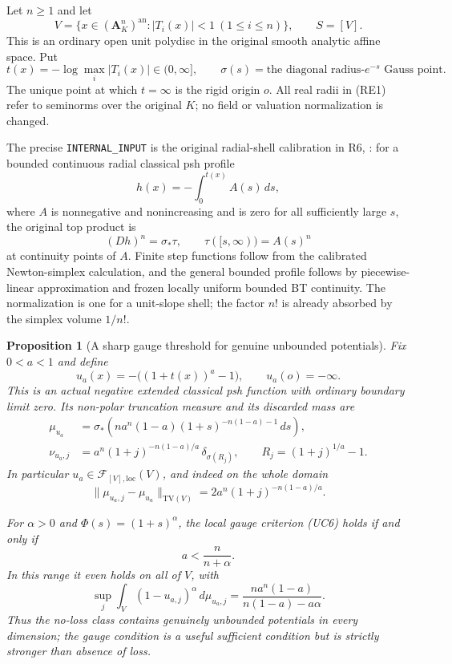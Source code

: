 \documentclass[11pt,a4paper]{article}
\numberwithin{equation}{section}
\newtheorem{proposition}[theorem]{Proposition}
\theoremstyle{definition}
\theoremstyle{remark}
\begin{document}
Let $n\geq1$ and let
\[
 V=\{x\in(\mathbf A_K^n)^{\mathrm{an}}:
                         |T_i(x)|<1\ (1\leq i\leq n)\},
 \qquad S=[V].
\]
This is an ordinary open unit polydisc in the original smooth
analytic affine space. Put
\[
 t(x)=-\log\max_i|T_i(x)|\in(0,\infty],
 \qquad \sigma(s)=\text{the diagonal radius-$e^{-s}$ Gauss point}.
 \tag{RE1}
\]
The unique point at which $t=\infty$ is the rigid origin $o$.
All real radii in (RE1) refer to seminorms over the original $K$;
no field or valuation normalization is changed.

The precise \texttt{INTERNAL\_INPUT} is the original radial-shell
calibration in R6,
:
for a bounded continuous radial classical psh profile
\[
 h(x)=-\int_0^{t(x)} A(s)\,ds,
\]
where $A$ is nonnegative and nonincreasing and is zero for all
sufficiently large $s$, the original top product is
\[
       (Dh)^n=\sigma_*\tau,
       \qquad \tau([s,\infty))=A(s)^n
 \tag{RE2}
\]
at continuity points of $A$. Finite step functions follow from
the calibrated Newton-simplex calculation, and the general bounded
profile follows by piecewise-linear approximation and frozen
locally uniform bounded BT continuity. The normalization is one
for a unit-slope shell; the factor $n!$ is already absorbed by
the simplex volume $1/n!$.

\begin{proposition}[A sharp gauge threshold for genuine unbounded potentials]
\label{prop:r11-radial-gauge-threshold}
Fix $0<a<1$ and define
\[
 u_a(x)=-\bigl((1+t(x))^a-1\bigr),\qquad u_a(o)=-\infty.
 \tag{RE3}
\]
This is an actual negative extended classical psh function with
ordinary boundary limit zero. Its non-polar truncation measure
and its discarded mass are
\[
 \begin{split}
 \mu_{u_a}
 &=\sigma_*\!\left(
     n a^n(1-a)(1+s)^{-n(1-a)-1}\,ds\right),\\
 \nu_{u_a,j}
 &=a^n(1+j)^{-n(1-a)/a}\,\delta_{\sigma(R_j)},
       \qquad R_j=(1+j)^{1/a}-1.
 \end{split}
 \tag{RE4}
\]
In particular $u_a\in\mathcal F_{[V],\mathrm{loc}}(V)$, and
indeed on the whole domain
\[
 \|\mu_{u_a,j}-\mu_{u_a}\|_{\mathrm{TV}(V)}
                       =2a^n(1+j)^{-n(1-a)/a}.
 \tag{RE5}
\]

For $\alpha>0$ and $\Phi(s)=(1+s)^\alpha$, the local
gauge criterion (UC6) holds if and only if
\[
                 a<\frac{n}{n+\alpha}.
 \tag{RE6}
\]
In this range it even holds on all of $V$, with
\[
 \sup_j\int_V(1-u_{a,j})^\alpha\,d\mu_{u_a,j}
       =\frac{n a^n(1-a)}{n(1-a)-a\alpha}.
 \tag{RE7}
\]
Thus the no-loss class contains genuinely unbounded potentials
in every dimension; the gauge condition is a useful sufficient
condition but is strictly stronger than absence of loss.
\end{proposition}
\end{document}
